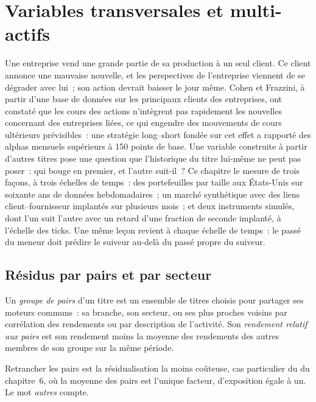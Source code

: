 \chapter{Variables transversales et multi-actifs}\label{ch:rs:cross-sectional-and-cross-asset-features}

Une entreprise vend une grande partie de sa production à un seul client. Ce client annonce une mauvaise nouvelle, et les perspectives de l'entreprise viennent de se dégrader
avec lui~; son action devrait baisser le jour même. Cohen et Frazzini, à partir d'une base de données sur les principaux clients des entreprises, ont constaté
que les cours des actions n'intègrent pas rapidement les nouvelles concernant des entreprises liées, ce qui engendre des mouvements de cours ultérieurs prévisibles~: une
stratégie long--short fondée sur cet effet a rapporté des alphas mensuels supérieurs à 150 points de base. Une variable construite à partir d'autres titres
pose une question que l'historique du titre lui-même ne peut pas poser~: qui bouge en premier, et l'autre suit-il~? Ce chapitre le mesure
de trois façons, à trois échelles de temps~: des portefeuilles par taille aux États-Unis sur soixante ans de données hebdomadaires~; un marché synthétique avec des liens client--fournisseur implantés
sur plusieurs mois~; et deux instruments simulés, dont l'un suit l'autre avec un retard d'une fraction de seconde implanté, à l'échelle des ticks.
Une même leçon revient à chaque échelle de temps~: le passé du meneur doit prédire le suiveur au-delà du passé propre du suiveur.

\section{Résidus par pairs et par secteur}

\begin{definition}\label{def:rs:cross-sectional-and-cross-asset-features:peer}
Un \emph{groupe de pairs} d'un titre est un ensemble de titres choisis pour partager ses moteurs communs~: sa branche,
son secteur, ou ses plus proches voisins par corrélation des rendements ou par description de l'activité. Son \emph{rendement relatif
aux pairs} est son rendement moins la moyenne des rendements des autres membres de son groupe sur la même
période.
\end{definition}

Retrancher les pairs est la résidualisation la moins coûteuse, cas particulier du  du chapitre~6, où la moyenne des pairs
est l'unique facteur, d'exposition égale à un. Le mot \emph{autres} compte.

